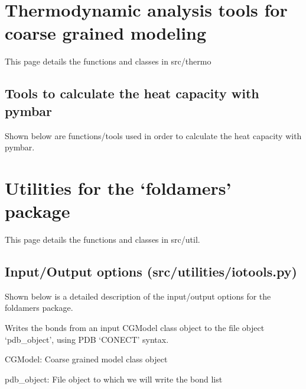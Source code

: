 \documentclass[letterpaper,12pt,english,openany,oneside]{sphinxmanual}
\begin{document}
\chapter{Thermodynamic analysis tools for coarse grained modeling}
\label{\detokenize{thermo:thermodynamic-analysis-tools-for-coarse-grained-modeling}}\label{\detokenize{thermo::doc}}
This page details the functions and classes in src/thermo


\section{Tools to calculate the heat capacity with pymbar}
\label{\detokenize{thermo:tools-to-calculate-the-heat-capacity-with-pymbar}}
Shown below are functions/tools used in order to calculate
the heat capacity with pymbar.


\chapter{Utilities for the ‘foldamers’ package}
\label{\detokenize{utilities:utilities-for-the-foldamers-package}}\label{\detokenize{utilities::doc}}
This page details the functions and classes in src/util.


\section{Input/Output options (src/utilities/iotools.py)}
\label{\detokenize{utilities:input-output-options-src-utilities-iotools-py}}
Shown below is a detailed description of the input/output
options for the foldamers package.

\label{\detokenize{utilities:module-utilities.iotools}}

\begin{fulllineitems}
\label{\detokenize{utilities:utilities.iotools.write_bonds}}
Writes the bonds from an input CGModel class object to the file object ‘pdb\_object’, using PDB ‘CONECT’ syntax.

CGModel: Coarse grained model class object

pdb\_object: File object to which we will write the bond list

\end{fulllineitems}
\end{document}
